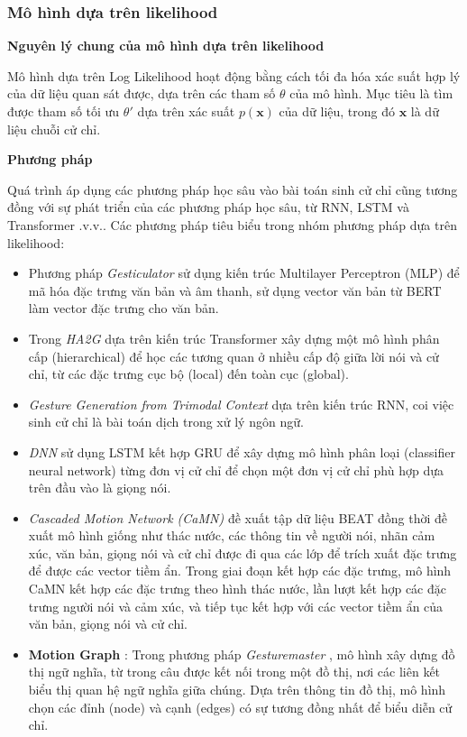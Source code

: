 \subsubsection{Mô hình dựa trên likelihood}

\textbf{Nguyên lý chung của mô hình dựa trên likelihood}

Mô hình dựa trên Log Likelihood hoạt động bằng cách tối đa hóa xác suất hợp lý của dữ liệu quan sát được, dựa trên các tham số $\theta$ của mô hình. Mục tiêu là tìm được tham số tối ưu $\theta'$ dựa trên xác suất $p(\mathbf{x})$ của dữ liệu, trong đó $\mathbf{x}$ là dữ liệu chuỗi cử chỉ.

\textbf{Phương pháp}

Quá trình áp dụng các phương pháp học sâu vào bài toán sinh cử chỉ cũng tương đồng với sự phát triển của các phương pháp học sâu, từ RNN, LSTM và Transformer .v.v.. Các phương pháp tiêu biểu trong nhóm phương pháp dựa trên likelihood:

\begin{itemize}[]
	\item Phương pháp \textit{Gesticulator} \cite{kucherenko2020gesticulator} sử dụng kiến trúc Multilayer Perceptron (MLP) để mã hóa đặc trưng văn bản và âm thanh, sử dụng vector văn bản từ BERT làm vector đặc trưng cho văn bản. 
	
	\item Trong \textit{HA2G} \cite{liu2022learning} dựa trên kiến trúc Transformer xây dựng một mô hình phân cấp (hierarchical) để học các tương quan ở nhiều cấp độ giữa lời nói và cử chỉ, từ các đặc trưng cục bộ (local) đến toàn cục (global). 
	
	\item \textit{Gesture Generation from Trimodal Context} \cite{yoon2020speech} dựa trên kiến trúc RNN, coi việc sinh cử chỉ là bài toán dịch trong xử lý ngôn ngữ. 
	
	\item \textit{DNN} \cite{chiu2015predicting} sử dụng LSTM kết hợp GRU để xây dựng mô hình phân loại (classifier neural network) từng đơn vị cử chỉ để chọn một đơn vị cử chỉ phù hợp dựa trên đầu vào là giọng nói. 
	
	\item \textit{Cascaded Motion Network (CaMN)} \cite{liu2022beat} đề xuất tập dữ liệu BEAT đồng thời đề xuất mô hình giống như thác nước, các thông tin về người nói, nhãn cảm xúc, văn bản, giọng nói và cử chỉ được đi qua các lớp để trích xuất đặc trưng để được các vector tiềm ẩn. Trong giai đoạn kết hợp các đặc trưng, mô hình CaMN kết hợp các đặc trưng theo hình thác nước, lần lượt kết hợp các đặc trưng người nói và cảm xúc, và tiếp tục kết hợp với các vector tiềm ẩn của văn bản, giọng nói và cử chỉ.
	
	\item \textbf{Motion Graph} : Trong phương pháp \textit{Gesturemaster} \cite{zhou2022gesturemaster}, mô hình xây dựng đồ thị ngữ nghĩa, từ trong câu được kết nối trong một đồ thị, nơi các liên kết biểu thị quan hệ ngữ nghĩa giữa chúng. Dựa trên thông tin đồ thị, mô hình chọn các đỉnh (node) và cạnh (edges) có sự tương đồng nhất để biểu diễn cử chỉ. 
	
\end{itemize}

